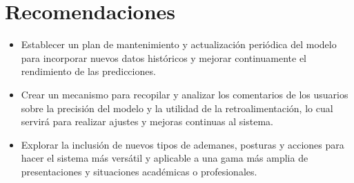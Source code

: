 \section{Recomendaciones}
    \begin{itemize}
        \item Establecer un plan de mantenimiento y actualización periódica del modelo para incorporar nuevos datos históricos y mejorar continuamente el rendimiento de las predicciones.
 
        \item Crear un mecanismo para recopilar y analizar los comentarios de los usuarios sobre la precisión del modelo y la utilidad de la retroalimentación, lo cual servirá para realizar ajustes y mejoras continuas al sistema.
        
        \item Explorar la inclusión de nuevos tipos de ademanes, posturas y acciones para hacer el sistema más versátil y aplicable a una gama más amplia de presentaciones y situaciones académicas o profesionales.
    \end{itemize}